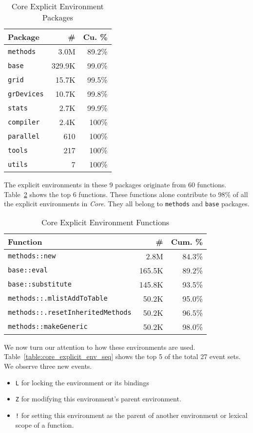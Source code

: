 \documentclass[10pt,review,sigplan,anonymous=true,authorversion=true,nonacm=true]{acmart}
\newcommand{\code}[1]{\lstinline |#1|\xspace}
\begin{document}
\begin{table}[!h]
  \small
  \caption{Core Explicit Environment Packages} \label{table:core_explicit_pack}
  \centering
  \begin{tabular}{lrr}
    \toprule
    \textbf{Package}&\textbf{\#}&\textbf{Cu. \%}\\
    \midrule
    \code{methods}&3.0M&89.2\%\\
    \code{base}&329.9K&99.0\%\\
    \code{grid}&15.7K&99.5\%\\
    \code{grDevices}&10.7K&99.8\%\\
    \code{stats}&2.7K&99.9\%\\
    \code{compiler}&2.4K&100\%\\
    \code{parallel}&610&100\%\\
    \code{tools}&217&100\%\\
    \code{utils}&7&100\%\\
    \bottomrule
  \end{tabular}
\end{table}

The explicit environments in these 9 packages originate from 60 functions.
Table~\ref{table:core_explicit_fun} shows the top 6 functions. These functions
alone contribute to 98\% of all the explicit environments in \emph{Core}. They
all belong to \code{methods} and \code{base} packages.

\begin{table}[!h]
  \small
  \caption{Core Explicit Environment Functions} \label{table:core_explicit_fun}
  \centering
  \begin{tabular}{lrr}
    \toprule
    \textbf{Function}&\textbf{\#}&\textbf{Cum. \%}\\
    \midrule
    \code{methods::new}&2.8M&84.3\%\\
    \code{base::eval}&165.5K&89.2\%\\
    \code{base::substitute}&145.8K&93.5\%\\
    \code{methods::.mlistAddToTable}&50.2K&95.0\%\\
    \code{methods::.resetInheritedMethods}&50.2K&96.5\%\\
    \code{methods::makeGeneric}&50.2K&98.0\%\\
    \bottomrule
  \end{tabular}
\end{table}

We now turn our attention to how these environments are used.
Table~\ref{table:core_explicit_env_seq} shows the top 5 of the total 27 event
sets. We observe three new events.
\begin{itemize}
\item \texttt{L} for locking the environment or its bindings
\item \texttt{Z} for modifying this environment's parent environment.
\item \texttt{!} for setting this environment as the parent of another
  environment or lexical scope of a function.
\end{itemize}
\end{document}
